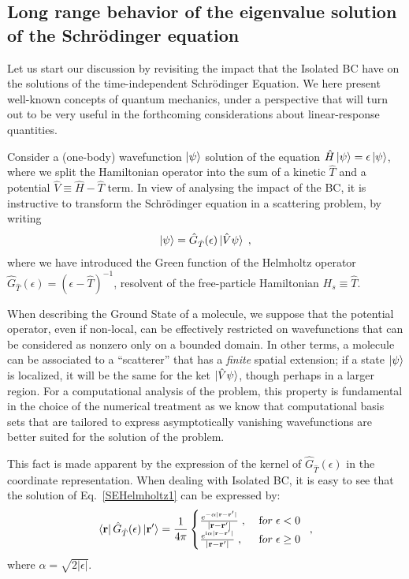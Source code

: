 \documentclass[reprint,aps,prb]{revtex4-1}
\renewcommand{\r}{{\bf r}}
\newcommand{\eps}{\epsilon}
\newcommand{\ii}{\mathrm{i}}
\newcommand{\be}{\begin{equation}}
\newcommand{\ee}{\end{equation}}
\newcommand{\lb}{\label}
\newcommand{\op}[1]{\hat {#1}}
\newcommand{\GH}{\op G_{\op T}}
\begin{document}
\subsection{Long range behavior of the eigenvalue solution of the Schr\"odinger equation}
\label{SEopenSystem}

Let us start our discussion by revisiting the impact that the Isolated BC have on the
solutions of the time-independent Schr\"odinger Equation.
We here present well-known concepts of quantum mechanics, under a perspective that
will turn out to be very useful in the forthcoming considerations about linear-response quantities.

Consider a (one-body) wavefunction $\ket{\psi}$ solution of the equation
$\op H\ket{\psi}=\eps\ket{\psi}$, where we split the Hamiltonian operator into the sum of
a kinetic $\op T$ and a potential $\op V \equiv \op H - \op T$ term.
In view of analysing the impact of the BC, it is instructive to transform
the Schr\"odinger equation in a scattering problem, by writing
\be\lb{SEHelmholtz1}
\ket{\psi} = \GH(\eps)\ket{\op V\psi}\;,
\ee
where we have introduced the Green function of the Helmholtz operator $\GH(\eps) = (\eps-\op T)^{-1}$,
resolvent of the free-particle Hamiltonian $H_s \equiv \op T$.

When describing the Ground State of a molecule, we suppose that the potential operator, even if non-local,
can be effectively restricted on wavefunctions that can be considered as nonzero only on a
bounded domain. In other terms, a molecule can be associated to a ``scatterer'' that has a \emph{finite}
spatial extension; if a state $\ket{\psi}$ is localized, it will be the same for the ket $\ket{\op V \psi}$, though
perhaps in a larger region.
For a computational analysis of the problem, this property is fundamental in the choice of the numerical treatment as we know that
computational basis sets
that are tailored to express asymptotically vanishing wavefunctions are better suited for the solution of the problem.

This fact is made apparent by the expression of
the kernel of $\GH(\eps)$ in the coordinate representation.
When dealing with Isolated BC, it is easy to see that the solution of Eq.~\eqref{SEHelmholtz1}
can be expressed by:
\be\lb{HelmholtzKernelDef1}
\bra{\r} \GH(\eps) \ket{\r'} = \frac{1}{4\pi} \begin{cases}
\frac{e^{-\alpha|\r - \r' |}}{|\r- \r' |} \;,\; & {\textrm for}\; \eps  < 0\; \\
\frac{e^{\ii \alpha |\r-\r' |}}{|\r-\r' |} \;, & {\textrm for} \; \eps \geq 0
\end{cases} \;,
\ee
where $\alpha = \sqrt{2|\eps|}$.
\end{document}
